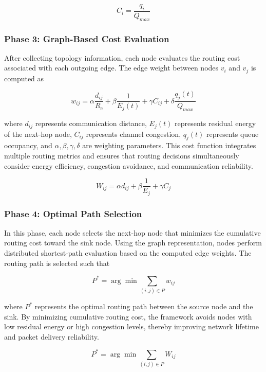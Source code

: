 \documentclass[a4paper,fleqn]{cas-dc}
\numberwithin{equation}{section}
\begin{document}
\begin{equation}
C_i = \frac{q_i}{Q_{max}}
\label{eq:congestion_metric}
\end{equation}

\subsubsection{Phase 3: Graph-Based Cost Evaluation}

After collecting topology information, each node evaluates the routing cost associated with each outgoing edge. The edge weight between nodes $v_i$ and $v_j$ is computed as

\[
w_{ij} = \alpha \frac{d_{ij}}{R_c} + \beta \frac{1}{E_j(t)} + \gamma C_{ij} + \delta \frac{q_j(t)}{Q_{max}}
\]

where $d_{ij}$ represents communication distance, $E_j(t)$ represents residual energy of the next-hop node, $C_{ij}$ represents channel congestion, $q_j(t)$ represents queue occupancy, and $\alpha,\beta,\gamma,\delta$ are weighting parameters. This cost function integrates multiple routing metrics and ensures that routing decisions simultaneously consider energy efficiency, congestion avoidance, and communication reliability.

\begin{equation}
W_{ij} = \alpha d_{ij} + \beta \frac{1}{E_j} + \gamma C_j
\label{eq:routing_cost}
\end{equation}

\subsubsection{Phase 4: Optimal Path Selection}

In this phase, each node selects the next-hop node that minimizes the cumulative routing cost toward the sink node. Using the graph representation, nodes perform distributed shortest-path evaluation based on the computed edge weights. The routing path is selected such that

\[
P^* = \arg \min \sum_{(i,j) \in P} w_{ij}
\]

where $P^*$ represents the optimal routing path between the source node and the sink. By minimizing cumulative routing cost, the framework avoids nodes with low residual energy or high congestion levels, thereby improving network lifetime and packet delivery reliability.

\begin{equation}
P^{*} = \arg\min \sum_{(i,j)\in P} W_{ij}
\label{eq:optimal_path}
\end{equation}
\end{document}
